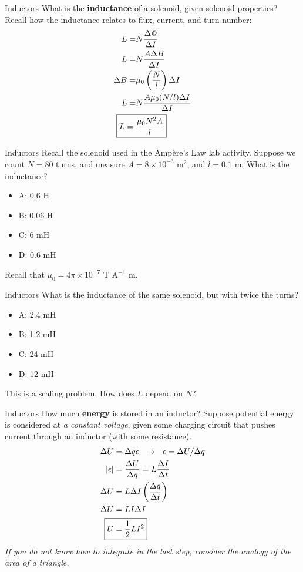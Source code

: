 \documentclass{beamer}
\begin{document}
\begin{frame}{Inductors}
What is the \textbf{\alert{inductance}} of a solenoid, given solenoid properties?  Recall how the inductance relates to flux, current, and turn number:
\begin{align}
L =& N \frac{\Delta \Phi}{\Delta I} \\
L =& N \frac{A \Delta B }{\Delta I} \\
\Delta B =& \mu_0 \left(\frac{N}{l}\right) \Delta I \\
L =& N\frac{A \mu_0 (N/l) \Delta I}{\Delta I} \\
\Aboxed{L =& \frac{\mu_0 N^2 A}{l}} \label{eq:solenoid_ind}
\end{align}
\end{frame}

\begin{frame}{Inductors}
Recall the solenoid used in the Amp\`{e}re's Law lab activity.  Suppose we count $N = 80$ turns, and measure $A = 8 \times 10^{-3}$ m$^2$, and $l = 0.1$ m.  What is the inductance?
\begin{itemize}
\item A: 0.6 H
\item B: 0.06 H
\item C: 6 mH 
\item D: 0.6 mH
\end{itemize}
\footnotesize
Recall that $\mu_0 = 4\pi \times 10^{-7}$ T A$^{-1}$ m.
\end{frame}

\begin{frame}{Inductors}
What is the inductance of the same solenoid, but with twice the turns?
\begin{itemize}
\item A: 2.4 mH
\item B: 1.2 mH
\item C: 24 mH 
\item D: 12 mH
\end{itemize}
\footnotesize
This is a scaling problem.  How does $L$ depend on $N$?
\end{frame}

\begin{frame}{Inductors}
\small
How much \textbf{\alert{energy}} is stored in an inductor?  Suppose potential energy is considered at \textit{a constant voltage}, given some charging circuit that pushes current through an inductor (with some resistance).
\begin{align}
\Delta U &= \Delta q \epsilon ~~ \rightarrow ~~ \epsilon = \Delta U/\Delta q \\
|\epsilon| &= \frac{\Delta U}{\Delta q} = L \frac{\Delta I}{\Delta t} \\
\Delta U &= L \Delta I \left( \frac{\Delta q}{\Delta t} \right) \\
\Delta U &= L I \Delta I \\
\Aboxed{ U &= \frac{1}{2} L I^2}
\end{align}
\footnotesize
\textit{If you do not know how to integrate in the last step, consider the analogy of the area of a triangle.}
\end{frame}
\end{document}
